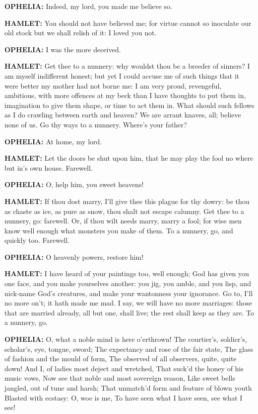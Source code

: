 \documentclass{article}
\begin{document}
\textbf{OPHELIA:}
    Indeed, my lord, you made me believe so.

\textbf{HAMLET:}
    You should not have believed me; for virtue cannot
    so inoculate our old stock but we shall relish of
    it: I loved you not.

\textbf{OPHELIA:}
    I was the more deceived.

\textbf{HAMLET:}
    Get thee to a nunnery: why wouldst thou be a
    breeder of sinners? I am myself indifferent honest;
    but yet I could accuse me of such things that it
    were better my mother had not borne me: I am very
    proud, revengeful, ambitious, with more offences at
    my beck than I have thoughts to put them in,
    imagination to give them shape, or time to act them
    in. What should such fellows as I do crawling
    between earth and heaven? We are arrant knaves,
    all; believe none of us. Go thy ways to a nunnery.
    Where's your father?

\textbf{OPHELIA:}
    At home, my lord.

\textbf{HAMLET:}
    Let the doors be shut upon him, that he may play the
    fool no where but in's own house. Farewell.

\textbf{OPHELIA:}
    O, help him, you sweet heavens!

\textbf{HAMLET:}
    If thou dost marry, I'll give thee this plague for
    thy dowry: be thou as chaste as ice, as pure as
    snow, thou shalt not escape calumny. Get thee to a
    nunnery, go: farewell. Or, if thou wilt needs
    marry, marry a fool; for wise men know well enough
    what monsters you make of them. To a nunnery, go,
    and quickly too. Farewell.

\textbf{OPHELIA:}
    O heavenly powers, restore him!

\textbf{HAMLET:}
    I have heard of your paintings too, well enough; God
    has given you one face, and you make yourselves
    another: you jig, you amble, and you lisp, and
    nick-name God's creatures, and make your wantonness
    your ignorance. Go to, I'll no more on't; it hath
    made me mad. I say, we will have no more marriages:
    those that are married already, all but one, shall
    live; the rest shall keep as they are. To a
    nunnery, go.

\textbf{OPHELIA:}
    O, what a noble mind is here o'erthrown!
    The courtier's, soldier's, scholar's, eye, tongue, sword;
    The expectancy and rose of the fair state,
    The glass of fashion and the mould of form,
    The observed of all observers, quite, quite down!
    And I, of ladies most deject and wretched,
    That suck'd the honey of his music vows,
    Now see that noble and most sovereign reason,
    Like sweet bells jangled, out of tune and harsh;
    That unmatch'd form and feature of blown youth
    Blasted with ecstasy: O, woe is me,
    To have seen what I have seen, see what I see!
\end{document}
